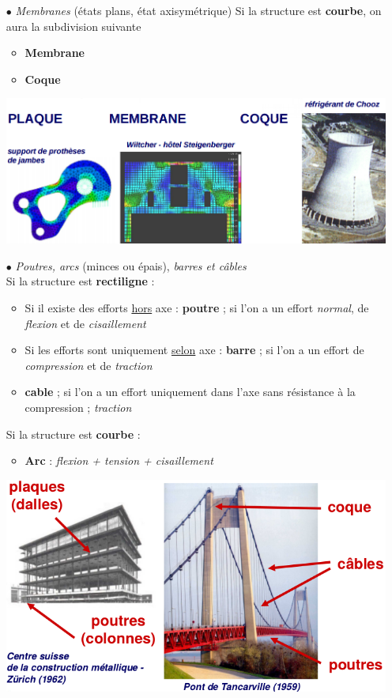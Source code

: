 \begin{itemize}
\item[$\bullet$] \textit{Membranes} (états plans, état axisymétrique)
Si la structure est \textbf{courbe}, on aura la subdivision suivante 
	\begin{itemize}
	\item \textbf{Membrane}
	\item \textbf{Coque}
	\end{itemize}
\begin{center}
\includegraphics[scale=0.4]{ch1/image1}
\end{center}
\newpage
\item[$\bullet$] \textit{Poutres, arcs} (minces ou épais), \textit{
barres et câbles}\\
Si la structure est \textbf{rectiligne} :
	\begin{itemize}
	\item Si il existe des efforts \underline{hors} axe : 
	\textbf{poutre} ;  si l'on a un effort \textit{normal}, de 
	\textit{flexion} et de \textit{cisaillement}
	\item Si les efforts sont uniquement \underline{selon} axe : 
	\textbf{barre}	;  si l'on a un effort de \textit{compression} 
	et de \textit{traction}
	\item \textbf{cable}	;  si l'on a un effort uniquement dans l'axe 
	sans résistance à la compression ; \textit{traction}
	\end{itemize}
Si la structure est \textbf{courbe} :
	\begin{itemize}
	\item \textbf{Arc } : \textit{flexion + tension + cisaillement}
	\end{itemize}	
	
\begin{center}
\includegraphics[scale=0.5]{ch1/image2}
\end{center}
\end{itemize}



